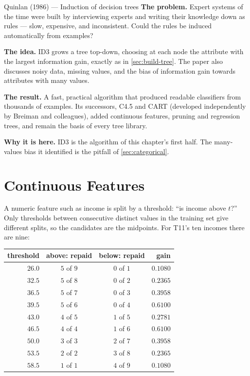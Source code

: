 \begin{researchspotlight}{Quinlan (1986) --- Induction of decision trees}
\textbf{The problem.} Expert systems of the time were built by interviewing
experts and writing their knowledge down as rules --- slow, expensive, and
inconsistent. Could the rules be induced automatically from examples?

\textbf{The idea.} ID3 grows a tree top-down, choosing at each node the attribute
with the largest information gain, exactly as in \cref{sec:build-tree}. The paper
also discusses noisy data, missing values, and the bias of information gain
towards attributes with many values.

\textbf{The result.} A fast, practical algorithm that produced readable
classifiers from thousands of examples. Its successors, C4.5 and CART (developed
independently by Breiman and colleagues), added continuous features, pruning and
regression trees, and remain the basis of every tree library.

\textbf{Why it is here.} ID3 is the algorithm of this chapter's first half. The
many-values bias it identified is the pitfall of \cref{sec:categorical}.
\parencite{quinlan1986}
\end{researchspotlight}

\section{Continuous Features}
\label{sec:continuous}

A numeric feature such as income is split by a threshold: ``is income above $t$?''
Only thresholds between consecutive distinct values in the training set give
different splits, so the candidates are the midpoints. For T11's ten incomes
there are nine:

\begin{center}
\small
\renewcommand{\arraystretch}{1.12}
\begin{tabular}{@{}rccr@{}}
\toprule
threshold & above: repaid & below: repaid & gain\\
\midrule
$26.0$ & $5$ of $9$ & $0$ of $1$ & $0.1080$\\
$32.5$ & $5$ of $8$ & $0$ of $2$ & $0.2365$\\
$36.5$ & $5$ of $7$ & $0$ of $3$ & $0.3958$\\
$39.5$ & $5$ of $6$ & $0$ of $4$ & $\mathbf{0.6100}$\\
$43.0$ & $4$ of $5$ & $1$ of $5$ & $0.2781$\\
$46.5$ & $4$ of $4$ & $1$ of $6$ & $\mathbf{0.6100}$\\
$50.0$ & $3$ of $3$ & $2$ of $7$ & $0.3958$\\
$53.5$ & $2$ of $2$ & $3$ of $8$ & $0.2365$\\
$58.5$ & $1$ of $1$ & $4$ of $9$ & $0.1080$\\
\bottomrule
\end{tabular}
\end{center}

